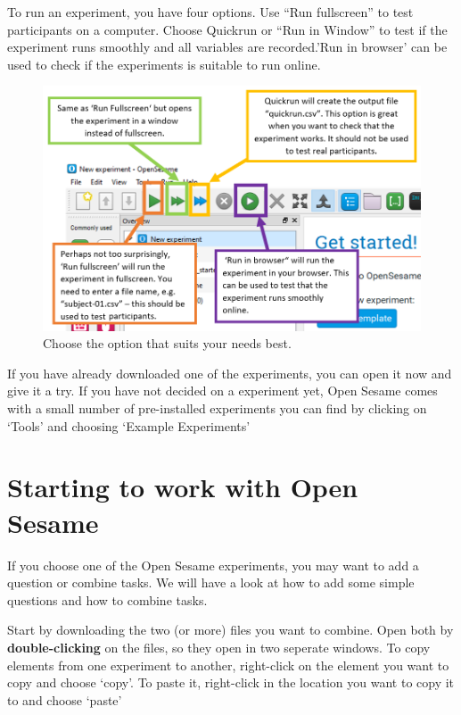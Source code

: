 \documentclass[
]{book}
\begin{document}
To run an experiment, you have four options. Use ``Run fullscreen'' to test participants on a computer. Choose Quickrun or ``Run in Window'' to test if the experiment runs smoothly and all variables are recorded.'Run in browser' can be used to check if the experiments is suitable to run online.

\begin{figure}

{\centering \includegraphics[width=0.85\linewidth]{images/opensesame/runexp} 

}

\caption{Choose the option that suits your needs best.}\label{fig:Figure12-4}
\end{figure}

If you have already downloaded one of the experiments, you can open it now and give it a try. If you have not decided on a experiment yet, Open Sesame comes with a small number of pre-installed experiments you can find by clicking on `Tools' and choosing `Example Experiments'

\hypertarget{starting-to-work-with-open-sesame}{%
\section{Starting to work with Open Sesame}\label{starting-to-work-with-open-sesame}}

If you choose one of the Open Sesame experiments, you may want to add a question or combine tasks. We will have a look at how to add some simple questions and how to combine tasks.

Start by downloading the two (or more) files you want to combine. Open both by \textbf{double-clicking} on the files, so they open in two seperate windows. To copy elements from one experiment to another, right-click on the element you want to copy and choose `copy'. To paste it, right-click in the location you want to copy it to and choose `paste'
\end{document}
